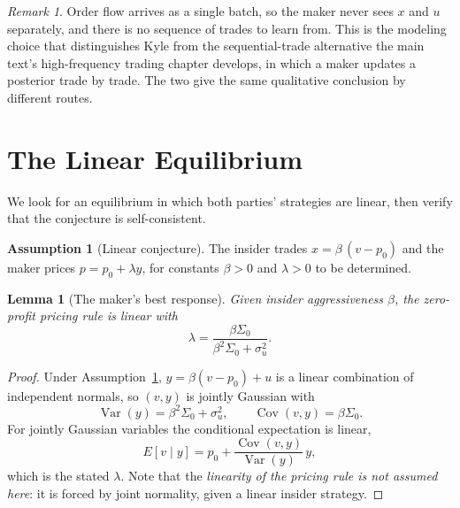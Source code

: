 \documentclass[11pt]{article}
\newtheorem{lemma}{Lemma}
\theoremstyle{remark}
\newtheorem*{remark}{Remark}
\theoremstyle{definition}
\newtheorem{assumption}{Assumption}
\begin{document}
\begin{remark}
\label{rem:batch}
Order flow arrives as a single batch, so the maker never sees $x$ and $u$ separately, and there is no sequence of trades to learn from. This is the modeling choice that distinguishes Kyle from the sequential-trade alternative the main text's high-frequency trading chapter develops, in which a maker updates a posterior trade by trade. The two give the same qualitative conclusion by different routes.
\end{remark}

\section{The Linear Equilibrium}
\label{sec:equilibrium}

We look for an equilibrium in which both parties' strategies are linear, then verify that the conjecture is self-consistent.

\begin{assumption}[Linear conjecture]
\label{ass:linear}
The insider trades $x = \beta\,(v - p_0)$ and the maker prices $p = p_0 + \lambda y$, for constants $\beta > 0$ and $\lambda > 0$ to be determined.
\end{assumption}

\begin{lemma}[The maker's best response]
\label{lem:maker}
Given insider aggressiveness $\beta$, the zero-profit pricing rule is linear with
\begin{equation}
\label{eq:makerbr}
\lambda = \frac{\beta\Sigma_0}{\beta^2\Sigma_0 + \sigma_u^2}.
\end{equation}
\end{lemma}

\begin{proof}
Under Assumption~\ref{ass:linear}, $y = \beta(v-p_0) + u$ is a linear combination of independent normals, so $(v,y)$ is jointly Gaussian with
\begin{equation*}
\operatorname{Var}(y) = \beta^2\Sigma_0 + \sigma_u^2, \qquad
\operatorname{Cov}(v,y) = \beta\Sigma_0 .
\end{equation*}
For jointly Gaussian variables the conditional expectation is linear,
\begin{equation*}
E[v\mid y] = p_0 + \frac{\operatorname{Cov}(v,y)}{\operatorname{Var}(y)}\,y,
\end{equation*}
which is the stated $\lambda$. Note that the \emph{linearity of the pricing rule is not assumed here}: it is forced by joint normality, given a linear insider strategy.
\end{proof}
\end{document}
